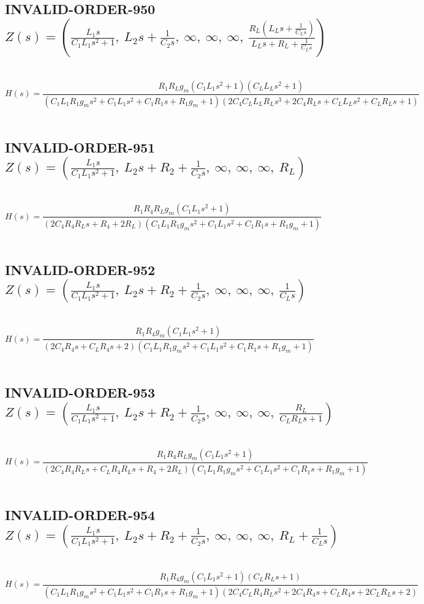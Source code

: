 \documentclass{article}
\begin{document}
\subsection{INVALID-ORDER-950 $Z(s) = \left( \frac{L_{1} s}{C_{1} L_{1} s^{2} + 1}, \  L_{2} s + \frac{1}{C_{2} s}, \  \infty, \  \infty, \  \infty, \  \frac{R_{L} \left(L_{L} s + \frac{1}{C_{L} s}\right)}{L_{L} s + R_{L} + \frac{1}{C_{L} s}}\right)$ } \ 
\textbf{\[H(s) = \frac{R_{1} R_{L} g_{m} \left(C_{1} L_{1} s^{2} + 1\right) \left(C_{L} L_{L} s^{2} + 1\right)}{\left(C_{1} L_{1} R_{1} g_{m} s^{2} + C_{1} L_{1} s^{2} + C_{1} R_{1} s + R_{1} g_{m} + 1\right) \left(2 C_{4} C_{L} L_{L} R_{L} s^{3} + 2 C_{4} R_{L} s + C_{L} L_{L} s^{2} + C_{L} R_{L} s + 1\right)}\] } \ 
\subsection{INVALID-ORDER-951 $Z(s) = \left( \frac{L_{1} s}{C_{1} L_{1} s^{2} + 1}, \  L_{2} s + R_{2} + \frac{1}{C_{2} s}, \  \infty, \  \infty, \  \infty, \  R_{L}\right)$ } \ 
\textbf{\[H(s) = \frac{R_{1} R_{4} R_{L} g_{m} \left(C_{1} L_{1} s^{2} + 1\right)}{\left(2 C_{4} R_{4} R_{L} s + R_{4} + 2 R_{L}\right) \left(C_{1} L_{1} R_{1} g_{m} s^{2} + C_{1} L_{1} s^{2} + C_{1} R_{1} s + R_{1} g_{m} + 1\right)}\] } \ 
\subsection{INVALID-ORDER-952 $Z(s) = \left( \frac{L_{1} s}{C_{1} L_{1} s^{2} + 1}, \  L_{2} s + R_{2} + \frac{1}{C_{2} s}, \  \infty, \  \infty, \  \infty, \  \frac{1}{C_{L} s}\right)$ } \ 
\textbf{\[H(s) = \frac{R_{1} R_{4} g_{m} \left(C_{1} L_{1} s^{2} + 1\right)}{\left(2 C_{4} R_{4} s + C_{L} R_{4} s + 2\right) \left(C_{1} L_{1} R_{1} g_{m} s^{2} + C_{1} L_{1} s^{2} + C_{1} R_{1} s + R_{1} g_{m} + 1\right)}\] } \ 
\subsection{INVALID-ORDER-953 $Z(s) = \left( \frac{L_{1} s}{C_{1} L_{1} s^{2} + 1}, \  L_{2} s + R_{2} + \frac{1}{C_{2} s}, \  \infty, \  \infty, \  \infty, \  \frac{R_{L}}{C_{L} R_{L} s + 1}\right)$ } \ 
\textbf{\[H(s) = \frac{R_{1} R_{4} R_{L} g_{m} \left(C_{1} L_{1} s^{2} + 1\right)}{\left(2 C_{4} R_{4} R_{L} s + C_{L} R_{4} R_{L} s + R_{4} + 2 R_{L}\right) \left(C_{1} L_{1} R_{1} g_{m} s^{2} + C_{1} L_{1} s^{2} + C_{1} R_{1} s + R_{1} g_{m} + 1\right)}\] } \ 
\subsection{INVALID-ORDER-954 $Z(s) = \left( \frac{L_{1} s}{C_{1} L_{1} s^{2} + 1}, \  L_{2} s + R_{2} + \frac{1}{C_{2} s}, \  \infty, \  \infty, \  \infty, \  R_{L} + \frac{1}{C_{L} s}\right)$ } \ 
\textbf{\[H(s) = \frac{R_{1} R_{4} g_{m} \left(C_{1} L_{1} s^{2} + 1\right) \left(C_{L} R_{L} s + 1\right)}{\left(C_{1} L_{1} R_{1} g_{m} s^{2} + C_{1} L_{1} s^{2} + C_{1} R_{1} s + R_{1} g_{m} + 1\right) \left(2 C_{4} C_{L} R_{4} R_{L} s^{2} + 2 C_{4} R_{4} s + C_{L} R_{4} s + 2 C_{L} R_{L} s + 2\right)}\] } \ 
\end{document}

